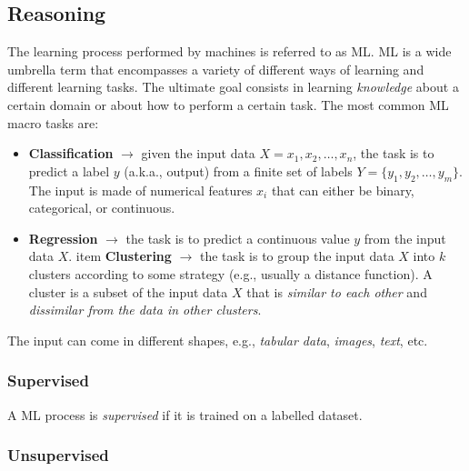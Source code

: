 \subsection{Reasoning}\label{subsec:reasoning}
%

\label{subsec:machine-learning}
%
The learning process performed by machines is referred to as \gls{ML}.
%
\gls{ML} is a wide umbrella term that encompasses a variety of different ways of learning and different learning tasks.
%
The ultimate goal consists in learning \emph{knowledge} about a certain domain or about how to perform a certain task.
%
The most common \gls{ML} macro tasks are:
%
\begin{itemize}
    \item \textbf{Classification} $\rightarrow$ given the input data $X={x_1, x_2, \dots, x_n}$, the task is to predict a label $y$ (a.k.a., output) from a finite set of labels $Y=\{y_1, y_2, \dots, y_m\}$.
    The input is made of numerical features $x_i$ that can either be binary, categorical, or continuous.
    \item \textbf{Regression} $\rightarrow$ the task is to predict a continuous value $y$ from the input data $X$.
    item \textbf{Clustering} $\rightarrow$ the task is to group the input data $X$ into $k$ clusters according to some strategy (e.g., usually a distance function).
    A cluster is a subset of the input data $X$ that is \emph{similar to each other} and \emph{dissimilar from the data in other clusters}.
\end{itemize}
%
The input can come in different shapes, e.g., \emph{tabular data}, \emph{images}, \emph{text}, etc.
%

\subsubsection{Supervised}\label{subsubsec:supervised}
%
A \gls{ML} process is \emph{supervised} if it is trained on a labelled dataset.

\subsubsection{Unsupervised}\label{subsubsec:unsupervised}

\subsubsection{}\label{subsubsec:rl}

